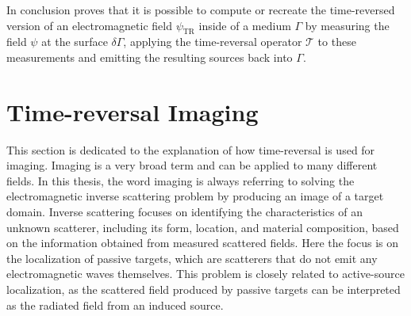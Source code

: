 In conclusion \parencite{de_rosny_theory_2010} proves that it is possible to compute or recreate the time-reversed version of an electromagnetic field \(\psi_{\text{TR}}\) inside of a medium \(\Gamma \) by measuring the field \(\psi \) at the surface \(\delta \Gamma \), applying the time-reversal operator \(\mathcal{T}\) to these measurements and emitting the resulting sources back into \(\Gamma \).



\section{Time-reversal Imaging}
This section is dedicated to the explanation of how time-reversal is used for imaging.
Imaging is a very broad term and can be applied to many different fields.
In this thesis, the word imaging is always referring to solving the electromagnetic inverse scattering problem by producing an image of a target domain.
Inverse scattering focuses on identifying the characteristics of an unknown scatterer, including its form, location, and material composition, based on the information obtained from measured scattered fields.
Here the focus is on the localization of passive targets, which are scatterers that do not emit any electromagnetic waves themselves.
This problem is closely related to active-source localization, as the scattered field produced by passive targets can be interpreted as the radiated field from an induced source.~\parencite{chen_computational_2018}


